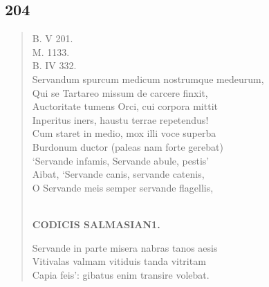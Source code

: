 \documentclass[11pt, a4paper]{report}
\begin{document}
            \subsection*{204}
      \begin{verse}
      B. V 201. \\ M. 1133. \\ B. IV 332. \\ Servandum spurcum medicum nostrumque medeurum, \\ Qui se Tartareo missum de carcere finxit, \\ Auctoritate tumens Orci, cui corpora mittit \\ Inperitus iners, haustu terrae repetendus! \\ Cum staret in medio, mox illi voce superba \\ Burdonum ductor (paleas nam forte gerebat) \\ ‘Servande infamis, Servande abule, pestis’ \\ Aibat, ‘Servande canis, servande catenis, \\  \lbrack O Servande meis semper servande flagellis, \\ 
        ﻿\pagebreak 
    \begin{center} \textbf{CODICIS SALMASIAN1.} \end{center} \marginpar{[177]} Servande in parte misera nabras tanos aesis \\ Vitivalas valmam vitiduis tanda vitritam \\ Capia feis’: gibatus enim transire volebat. \\ 
      \end{verse}
  
\end{document}
